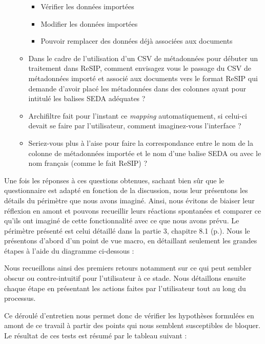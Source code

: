 \begin{enumerate}
\begin{itemize}
		\begin{itemize}
			\item Vérifier les données importées
			\item Modifier les données importées
			\item Pouvoir remplacer des données déjà associées aux documents
		\end{itemize}
		\item Dans le cadre de l’utilisation d’un CSV de métadonnées pour débuter un traitement dans ReSIP, comment envisagez vous le passage du CSV de métadonnées importé et associé aux documents vers le format ReSIP qui demande d’avoir placé les métadonnées dans des colonnes ayant pour intitulé les balises \gls{SEDA} adéquates ?
		\item \gls{Archifiltre} fait pour l’instant ce \textit{\gls{mapping}} automatiquement, si celui-ci devait se faire par l’utilisateur, comment imaginez-vous l’interface ?
		\item Seriez-vous plus à l’aise pour faire la correspondance entre le nom de la colonne de métadonnées importée et le nom d’une balise \gls{SEDA} ou avec le nom français (comme le fait ReSIP) ?
	\end{itemize}
\end{enumerate}


Une fois les réponses à ces questions obtenues, sachant bien sûr que le questionnaire est adapté en fonction de la discussion, nous leur présentons les détails du périmètre que nous avons imaginé. Ainsi, nous évitons de biaiser leur réflexion en amont et pouvons recueillir leurs réactions spontanées et comparer ce qu’ils ont imaginé de cette fonctionnalité avec ce que nous avons prévu. Le périmètre présenté est celui détaillé dans la partie 3, chapitre 8.1 (p.\pageref{figure18}). Nous le présentons d’abord d’un point de vue macro, en détaillant seulement les grandes étapes à l’aide du diagramme ci-dessous : 



Nous recueillons ainsi des premiers retours notamment sur ce qui peut sembler obscur ou contre-intuitif pour l’utilisateur à ce stade. Nous détaillons ensuite chaque étape en présentant les actions faites par l’utilisateur tout au long du processus. 


Ce déroulé d’entretien nous permet donc de vérifier les hypothèses formulées en amont de ce travail à partir des points qui nous semblent susceptibles de bloquer.  
Le résultat de ces tests est résumé par le tableau suivant : 

